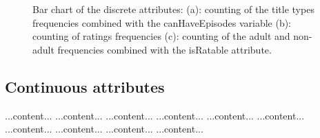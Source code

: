 \begin{figure}[h!]
    \centering
    \caption{Bar chart of the discrete attributes: (a): counting of the title types frequencies combined with the canHaveEpisodes variable (b): counting of ratings frequencies (c): counting of the adult and non-adult frequencies combined with the isRatable attribute.}
    \label{fig:bar-charts}
\end{figure}
\subsection{Continuous attributes}
...content...
...content...
...content...
...content...
...content...
...content...
...content...
...content...
...content...
...content...



